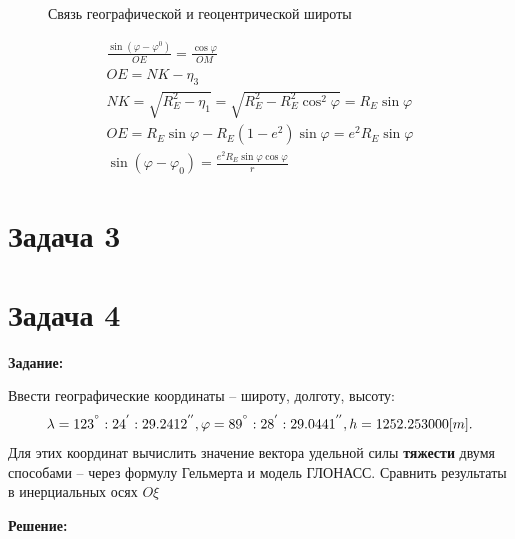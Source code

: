 \documentclass[a4paper,14pt]{article}
\theoremstyle{plain} %
\theoremstyle{definition} %
\theoremstyle{remark} %
\begin{document}
{\begin{itemize}
\end{itemize}
\begin{figure}[H]
    \caption{Связь географической и геоцентрической широты}
    \label{fig:picture}
\end{figure}
\begin{align*}
    \frac{\sin(\varphi-\varphi^0)}{OE}=
    \frac{\cos\varphi}{OM} \\
    OE=NK-\eta_3 \\
    NK=\sqrt{R_E^2-\eta_1}=\sqrt{R_E^2-R_E^2\cos^2\varphi}=R_E\sin\varphi \\
    OE=R_E\sin\varphi-R_E(1-e^2)\sin\varphi=e^2R_E\sin\varphi \\
    \sin(\varphi-\varphi_0)=\frac{e^2R_E\sin\varphi\cos\varphi}{r}
\end{align*}


\section{Задача 3}
\section{Задача 4}
\textbf{Задание:}

Ввести географические координаты -- широту, долготу, высоту:
\[
    \lambda=123^{\degree}:24^{'}:29.2412^{''}, \varphi=89^{\degree}:28^{'}:29.0441^{''}, h=1252.253000[m].
\]
Для этих координат вычислить значение вектора удельной силы
\textbf{тяжести} двумя способами -- через формулу Гельмерта и модель ГЛОНАСС.
Сравнить результаты в инерциальных осях $O\xi$

\textbf{Решение:}

}
\end{document}
